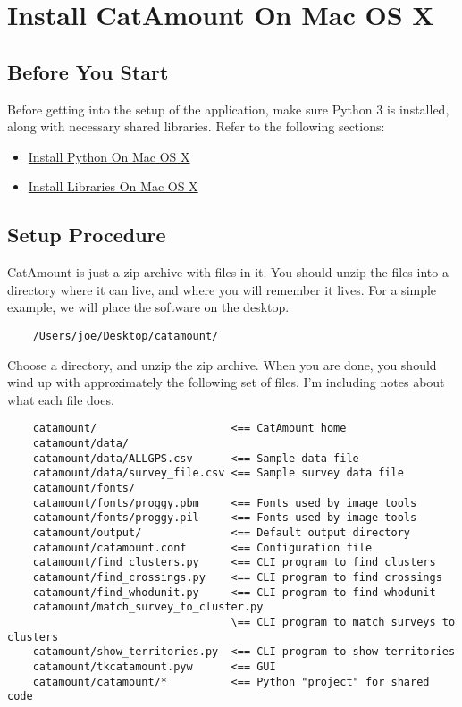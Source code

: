 \chapter{Install CatAmount On Mac OS X}
\hypertarget{macosx-install-catamount}{}

\section{Before You Start}
\hypertarget{setup}{}

Before getting into the setup of the application, make sure Python 3
is installed, along with necessary shared libraries. Refer to the
following sections:

\begin{itemize}
\item \hyperlink{macosx-install-python}{Install Python On Mac OS X}
\item \hyperlink{macosx-install-libraries}{Install Libraries On Mac OS X}
\end{itemize}

\section{Setup Procedure}

CatAmount is just a zip archive with files in it. You should unzip
the files into a directory where it can live, and where you will
remember it lives. For a simple example, we will place the software
on the desktop.

\begin{verbatim}
    /Users/joe/Desktop/catamount/
\end{verbatim}

Choose a directory, and unzip the zip archive. When you are done,
you should wind up with approximately the following set of files.
I'm including notes about what each file does.

\begin{verbatim}
    catamount/                     <== CatAmount home
    catamount/data/
    catamount/data/ALLGPS.csv      <== Sample data file
    catamount/data/survey_file.csv <== Sample survey data file
    catamount/fonts/
    catamount/fonts/proggy.pbm     <== Fonts used by image tools
    catamount/fonts/proggy.pil     <== Fonts used by image tools
    catamount/output/              <== Default output directory
    catamount/catamount.conf       <== Configuration file
    catamount/find_clusters.py     <== CLI program to find clusters
    catamount/find_crossings.py    <== CLI program to find crossings
    catamount/find_whodunit.py     <== CLI program to find whodunit
    catamount/match_survey_to_cluster.py
                                   \== CLI program to match surveys to clusters
    catamount/show_territories.py  <== CLI program to show territories
    catamount/tkcatamount.pyw      <== GUI
    catamount/catamount/*          <== Python "project" for shared code
\end{verbatim}

